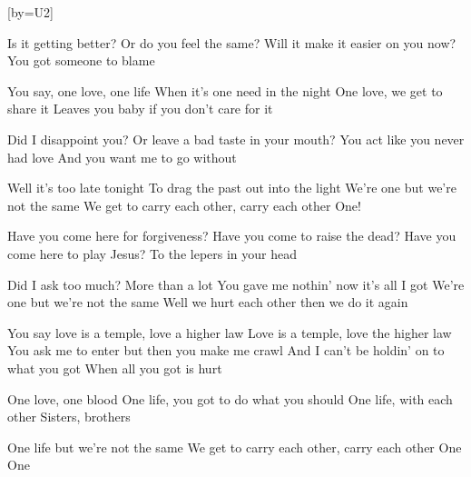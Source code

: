 [by={U2}]

  \beginverse
  Is it getting better?
  Or do you feel the same?
  Will it make it easier on you now?
  You got someone to blame
  \endverse

  \beginverse
  You say, one love, one life
  When it's one need in the night
  One love, we get to share it
  Leaves you baby if you don't care for it
  \endverse

  \beginverse
  Did I disappoint you?
  Or leave a bad taste in your mouth?
  You act like you never had love
  And you want me to go without
  \endverse

  \beginverse
  Well it's too late tonight
  To drag the past out into the light
  We're one but we're not the same
  We get to carry each other, carry each other
  One!
  \endverse

  \beginverse
  Have you come here for forgiveness?
  Have you come to raise the dead?
  Have you come here to play Jesus?
  To the lepers in your head
  \endverse

  \beginverse
  Did I ask too much? More than a lot
  You gave me nothin' now it's all I got
  We're one but we're not the same
  Well we hurt each other then we do it again
  \endverse

  \beginverse
  You say love is a temple, love a higher law
  Love is a temple, love the higher law
  You ask me to enter but then you make me crawl
  And I can't be holdin' on to what you got
  When all you got is hurt
  \endverse

  \beginverse
  One love, one blood
  One life, you got to do what you should
  One life, with each other
  Sisters, brothers
  \endverse

  \beginverse
  One life but we're not the same
  We get to carry each other, carry each other
  One
  One
  \endverse
\endsong
